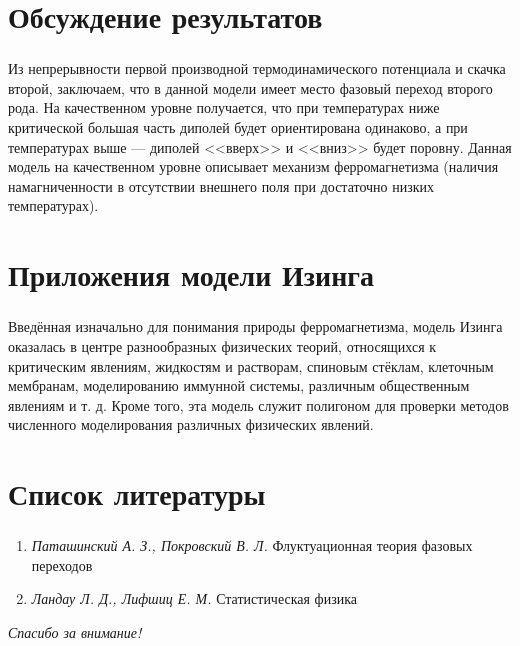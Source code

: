 \documentclass[c]{beamer}
\begin{document}
\section{Обсуждение результатов}
\begin{frame}
\frametitle{\insertsection}
Из непрерывности первой производной термодинамического
потенциала и скачка второй, заключаем, что в данной модели
имеет место фазовый переход второго рода. На качественном
уровне получается, что при температурах ниже критической
большая часть диполей будет ориентирована одинаково,
а при температурах выше --- диполей <<вверх>> и <<вниз>>
будет поровну. Данная модель на качественном уровне
описывает механизм ферромагнетизма (наличия намагниченности
в отсутствии внешнего поля при достаточно низких температурах).
\end{frame}
\section{Приложения модели Изинга}
\begin{frame}
\frametitle{\insertsection}
Введённая изначально для понимания природы ферромагнетизма, модель Изинга оказалась в центре разнообразных физических теорий, относящихся к критическим явлениям, жидкостям и растворам, спиновым стёклам, клеточным мембранам, моделированию иммунной системы, различным общественным явлениям и т. д. Кроме того, эта модель служит полигоном для проверки методов численного моделирования различных физических явлений.
\end{frame}
\section{Список литературы}
\begin{frame}
\frametitle{\insertsection}
\begin{enumerate}
	\item \emph{Паташинский А. З., Покровский В. Л.} Флуктуационная
	теория фазовых переходов
\item \emph{Ландау Л. Д., Лифшиц Е. М.} Статистическая физика
\end{enumerate}
\end{frame}
\begin{frame}
  \centering \Large
  \emph{Спасибо за внимание!}
\end{frame}
\end{document}
